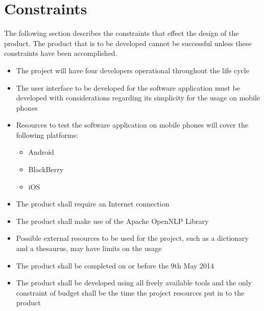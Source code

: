 \section{Constraints}

The following section describes the constraints that effect the design of the
product. The product that is to be developed cannot be successful unless these
constraints have been accomplished.

\begin{itemize}
  \item The project will have four developers operational throughout the life 
        cycle
  \item The user interface to be developed for the software application must
        be developed with considerations regarding its simplicity for the usage 
        on mobile phones 
  \item Resources to test the software application on mobile phones will cover 
        the following platforms:
    \begin{itemize}
      \item Android 
      \item BlackBerry
      \item iOS
    \end{itemize}
  \item The product shall require an Internet connection
  \item The product shall make use of the Apache OpenNLP Library
  \item Possible external resources to be used for the project, such as a 
        dictionary and a thesaurus, may have limits on the usage
  \item The product shall be completed on or before the 9th May 2014
  \item The product shall be developed using all freely available tools and the
        only constraint of budget shall be the time the project resources put in
        to the product
\end{itemize}


